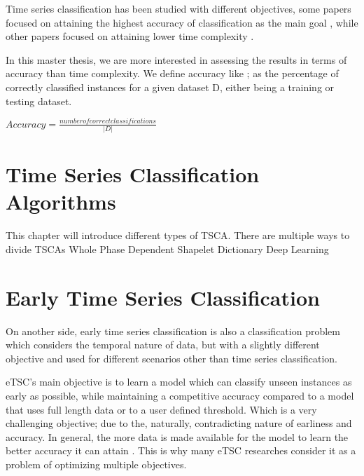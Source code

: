 Time series classification has been studied with different objectives, some papers focused on attaining the highest accuracy of classification as the main goal \cite{kate2016using,jeong2011weighted,bostrom2017shapelet,lines2018time,schafer2017multivariate,fawaz2020inceptiontime},
while other papers focused on attaining lower time complexity \cite{ratanamahatana2004making,bagnall2017great,tan2020fastee,petitjean2016faster,schafer2017fast}.

In this master thesis, we are more interested in assessing the results in terms of accuracy than time complexity. We define accuracy like \cite{schafer2020teaser}; 
as the percentage of correctly classified instances for a given dataset D, either being a training or testing dataset.
\begin{definition}
    $Accuracy = \frac{number of correct classifications}{|D|}$
\end{definition}

\section{Time Series Classification Algorithms}
This chapter will introduce different types of TSCA. There are multiple ways to divide TSCAs 
{Whole}
{Phase Dependent}
{Shapelet}
{Dictionary}
{Deep Learning}

\section{Early Time Series Classification}
\label{EarlyTimeSeriesClassification}
On another side, early time series classification is also a classification problem which considers the temporal nature of data,
but with a slightly different objective and used for different scenarios other than time series classification.

eTSC's main objective is to learn a model which can classify unseen instances as early as possible,
while maintaining a competitive accuracy compared to a model that uses full length data or to a user defined threshold\cite{xing2009early}.
Which is a very challenging objective; due to the, naturally, contradicting nature of earliness and accuracy.
In general, the more data is made available for the model to learn the better accuracy it can attain \cite{mori2019early,tavenard2016cost,xing2012early,mori2017reliable}.
This is why many eTSC researches consider it as a problem of optimizing multiple objectives.

